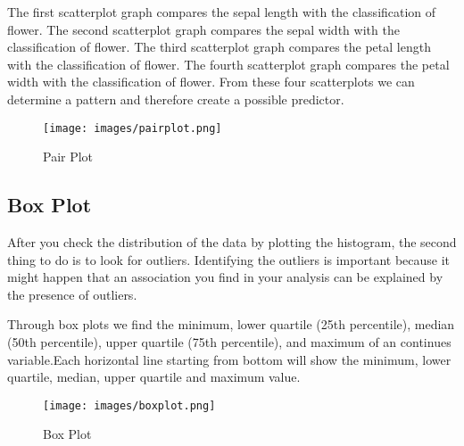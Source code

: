 \documentclass[11pt,letterpaper]{article}
\begin{document}
The first scatterplot graph compares the
sepal length with the classification of flower.
The second scatterplot graph compares
the sepal width with the classification of flower.
The third scatterplot graph compares the
petal length with the classification of flower. The fourth scatterplot graph compares the
petal width with the classification of flower.
From these four scatterplots we can determine a
pattern and therefore create a possible predictor. 

\begin{figure}[ht]
\centering
\label{fig:pairplot}
\graphicspath{ {images/} }
\texttt{[image: images/pairplot.png]}
\caption{Pair Plot}
\end{figure}

\subsection*{Box Plot}
After you check the distribution of the data by plotting the histogram, the second thing to do is to look for outliers. Identifying the outliers is important because it might happen that an association you find in your analysis can be explained by the presence of outliers.


Through box plots we find the minimum, lower quartile (25th percentile), median (50th percentile), upper quartile (75th percentile), and maximum of an continues variable.Each horizontal line starting from bottom will show the minimum, lower quartile, median, upper quartile and maximum value.


\begin{figure}[ht]
\centering
\label{fig:boxplot}
\graphicspath{ {images/} }
\texttt{[image: images/boxplot.png]}
\caption{Box Plot}
\end{figure}



\bigskip
\bigskip
\bigskip
\bigskip
\bigskip
\bigskip
\bigskip
\bigskip
\bigskip

\bigskip
\bigskip
\bigskip
\end{document}

